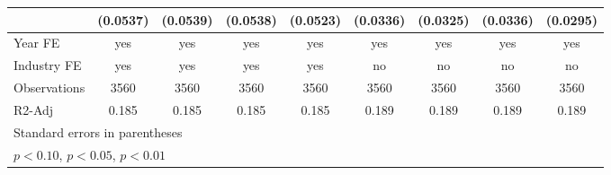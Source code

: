 \begin{table}[htbp]
\begin{tabular}{l*{8}{c}}
                    &    (0.0537)         &    (0.0539)         &    (0.0538)         &    (0.0523)         &    (0.0336)         &    (0.0325)         &    (0.0336)         &    (0.0295)         \\
\hline
Year FE             &         yes         &         yes         &         yes         &         yes         &         yes         &         yes         &         yes         &         yes         \\
Industry FE         &         yes         &         yes         &         yes         &         yes         &          no         &          no         &          no         &          no         \\
Observations        &        3560         &        3560         &        3560         &        3560         &        3560         &        3560         &        3560         &        3560         \\
R2-Adj              &       0.185         &       0.185         &       0.185         &       0.185         &       0.189         &       0.189         &       0.189         &       0.189         \\
\hline\hline
\multicolumn{9}{l}{\footnotesize Standard errors in parentheses}\\
\multicolumn{9}{l}{\footnotesize \sym{*} \(p<0.10\), \sym{**} \(p<0.05\), \sym{***} \(p<0.01\)}\\
\end{tabular}
\end{table}
